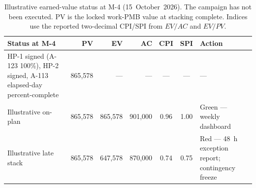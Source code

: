 \begin{table}[H]
\centering
\footnotesize
\setlength{\tabcolsep}{4.0pt}
\caption[Illustrative earned-value status at M-4]{Illustrative earned-value status at M-4 (15~October~2026). The campaign has not been executed. PV is the locked work-PMB value at stacking complete. Indices use the reported two-decimal CPI/SPI from $EV/AC$ and $EV/PV$.}
\label{tab:evm-m4}
\begin{tabularx}{\textwidth}{@{}>{\raggedright\arraybackslash}p{4.55cm} r r r c c X@{}}
\toprule
Status at M-4 & PV & EV & AC & CPI & SPI & Action \\
\midrule
HP-1 signed (A-123 100\%), HP-2 signed, A-113 elapsed-day percent-complete & 865{,}578 & --- & --- & --- & --- & --- \\
Illustrative on-plan & 865{,}578 & 865{,}578 & 901{,}000 & 0.96 & 1.00 & Green --- weekly dashboard \\
Illustrative late stack & 865{,}578 & 647{,}578 & 870{,}000 & 0.74 & 0.75 & Red --- 48~h exception report; contingency freeze \\
\bottomrule
\end{tabularx}
\end{table}
